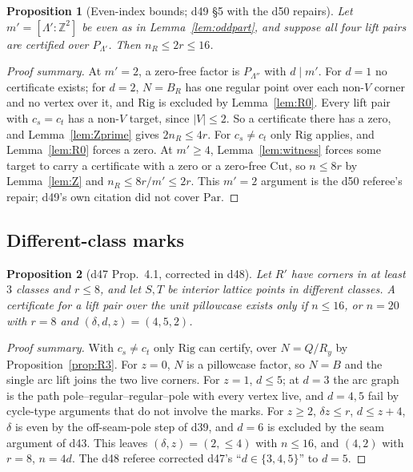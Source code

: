 \documentclass[11pt]{article}
\newtheorem{proposition}{Proposition}
\theoremstyle{definition}
\theoremstyle{remark}
\newcommand{\Z}{\mathbb Z}
\newcommand{\Par}{\mathrm{Par}}
\newcommand{\Rig}{\mathrm{Rig}}
\newcommand{\Cut}{\mathrm{Cut}}
\begin{document}
\begin{proposition}[Even-index bounds; d49 \S5 with the d50 repairs]\label{prop:even}
Let $m'=[\Lambda':\Z^2]$ be even as in Lemma~\ref{lem:oddpart}, and suppose all
four lift pairs are certified over $P_{\Lambda'}$. Then $n_R\le 2r\le 16$.
\end{proposition}

\begin{proof}[Proof summary]
At $m'=2$, a zero-free factor is $P_{\Lambda''}$ with $d\mid m'$. For $d=1$ no
certificate exists; for $d=2$, $N=B_R$ has one regular point over each non-$V$
corner and no vertex over it, and $\Rig$ is excluded by Lemma~\ref{lem:R0}.
Every lift pair with $c_s=c_t$ has a non-$V$ target, since $|V|\le 2$. So a
certificate there has a zero, and Lemma~\ref{lem:Zprime} gives $2n_R\le 4r$.
For $c_s\ne c_t$ only $\Rig$ applies, and Lemma~\ref{lem:R0} forces a zero. At
$m'\ge 4$, Lemma~\ref{lem:witness} forces some target to carry a certificate
with a zero or a zero-free $\Cut$, so $n\le 8r$ by Lemma~\ref{lem:Z} and
$n_R\le 8r/m'\le 2r$. This $m'=2$ argument is the d50 referee's repair; d49's
own citation did not cover $\Par$.
\end{proof}

\subsection{Different-class marks}

\begin{proposition}[d47 Prop.~4.1, corrected in d48]\label{prop:diffclass}
Let $R'$ have corners in at least $3$ classes and $r\le 8$, and let $S,T$ be
interior lattice points in different classes. A certificate for a lift pair
over the unit pillowcase exists only if $n\le 16$, or $n=20$ with $r=8$ and
$(\delta,d,z)=(4,5,2)$.
\end{proposition}

\begin{proof}[Proof summary]
With $c_s\ne c_t$ only $\Rig$ can certify, over $N=Q/R_y$ by
Proposition~\ref{prop:R3}. For $z=0$, $N$ is a pillowcase factor, so $N=B$ and
the single arc lift joins the two live corners. For $z=1$, $d\le 5$; at $d=3$
the arc graph is the path pole--regular--regular--pole with every vertex live,
and $d=4,5$ fail by cycle-type arguments that do not involve the marks. For
$z\ge 2$, $\delta z\le r$, $d\le z+4$, $\delta$ is even by the off-seam-pole
step of d39, and $d=6$ is excluded by the seam argument of d43. This leaves
$(\delta,z)=(2,\le 4)$ with $n\le 16$, and $(4,2)$ with $r=8$, $n=4d$. The d48
referee corrected d47's ``$d\in\{3,4,5\}$'' to $d=5$.
\end{proof}
\end{document}
